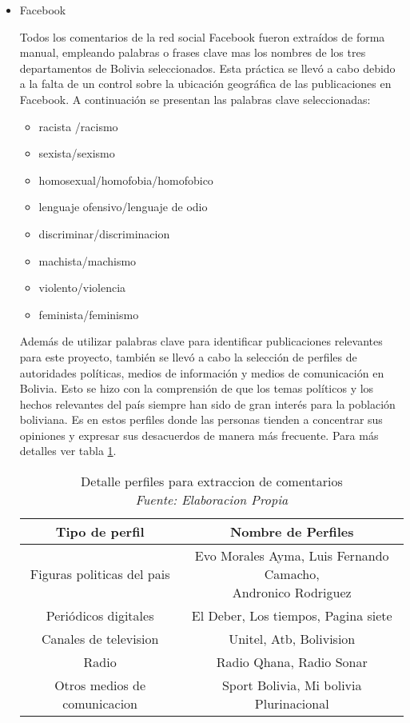 \begin{itemize}

\item Facebook

Todos los comentarios de la red social Facebook fueron extraídos de forma manual, empleando palabras o frases clave mas los nombres de los tres departamentos de Bolivia seleccionados. Esta práctica se llevó a cabo debido a la falta de un control sobre la ubicación geográfica de las publicaciones en Facebook. A continuación se presentan las palabras clave seleccionadas:
\begin{itemize}
	\item racista /racismo
	\item sexista/sexismo
	\item homosexual/homofobia/homofobico
	\item lenguaje ofensivo/lenguaje de odio 
	\item discriminar/discriminacion
	\item machista/machismo
	\item violento/violencia
	\item feminista/feminismo  
\end{itemize}

Además de utilizar palabras clave para identificar publicaciones relevantes para este proyecto, también se llevó a cabo la selección de perfiles de autoridades políticas, medios de información y medios de comunicación en Bolivia. Esto se hizo con la comprensión de que los temas políticos y los hechos relevantes del país siempre han sido de gran interés para la población boliviana. Es en estos perfiles donde las personas tienden a concentrar sus opiniones y expresar sus desacuerdos de manera más frecuente. Para más detalles ver tabla \ref{tbl:16}.


\begin{table}[!ht]
	\centering
	\begin{tabular}{|c|c|}
		\hline
		\textbf{Tipo de perfil} & \textbf{Nombre de Perfiles} \\ \hline
		Figuras politicas del pais  & \makecell{Evo Morales Ayma, Luis Fernando Camacho, \\  Andronico Rodriguez} \\ \hline
		Periódicos digitales                       & El Deber, Los tiempos, Pagina siete \\ \hline
		Canales de television & Unitel, Atb, Bolivision \\ \hline
		Radio  & Radio Qhana, Radio Sonar \\ \hline
		Otros medios de comunicacion & Sport Bolivia, Mi bolivia Plurinacional \\ \hline
	\end{tabular}
	\caption{Detalle perfiles para extraccion de comentarios
		\\\textit{Fuente: Elaboracion Propia}}
	\label{tbl:16}
\end{table}


\end{itemize}
